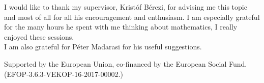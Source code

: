 \vspace{0.4cm}

I would like to thank my supervisor, Kristóf Bérczi, for advising me this topic
and most of all for all his encouragement and enthusiasm. I am especially grateful for the many hours
he spent with me thinking about mathematics, I really enjoyed these sessions.\\
I am also grateful for Péter Madarasi for his useful suggestions.

\vfill

Supported by the European Union, co-financed by the European Social Fund.\\(EFOP-3.6.3-VEKOP-16-2017-00002.)
